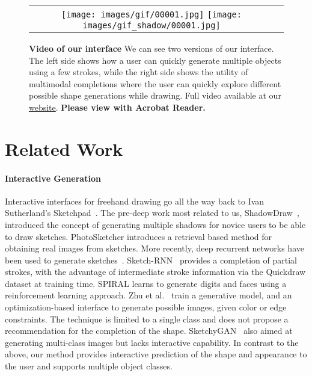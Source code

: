 \begin{figure}[t]
	\centering  
	\begin{tabular}{cc}
		\texttt{[image: images/gif/00001.jpg]} \hspace{4pt}
		\texttt{[image: images/gif\_shadow/00001.jpg]} 
		\\
	\end{tabular}
	\caption{{\bf Video of our interface} We can see two versions of our interface. The left side shows how a user can quickly generate multiple objects using a few strokes, while the right side shows the utility of multimodal completions where the user can quickly explore different possible shape generations while drawing. Full video available at our \href{https://arnabgho.github.io/iSketchNFill/}{website}. { \textbf{Please view with Acrobat Reader.}}}\label{fig:gui}
\end{figure}


\section{Related Work}

\paragraph{Interactive Generation} Interactive interfaces for freehand drawing go all the way back to Ivan Sutherland's Sketchpad~\cite{sutherland64}.  The pre-deep work most related to us, ShadowDraw~\cite{lee2011shadowdraw}, introduced the concept of generating multiple shadows for novice users to be able to draw sketches. PhotoSketcher \cite{eitz2011photosketcher} introduces a retrieval based method for obtaining real images from sketches. %
More recently, deep recurrent networks have been used to generate sketches~\cite{ha2017neural,ganin2018synthesizing}. Sketch-RNN~\cite{ha2017neural} provides a completion of partial strokes, with the advantage of intermediate stroke information via the Quickdraw dataset at training time. SPIRAL \cite{ganin2018synthesizing} learns to generate digits and faces using a reinforcement learning approach.
Zhu et al.~\cite{zhu2016generative} train a generative model, and an optimization-based interface to generate possible images, given color or edge constraints. The technique is limited to a single class and does not propose a recommendation for the completion of the shape. SketchyGAN~\cite{chen2018sketchygan} also aimed at generating multi-class images but lacks interactive capability. In contrast to the above, our method provides interactive prediction of the shape and appearance to the user and supports multiple object classes.
